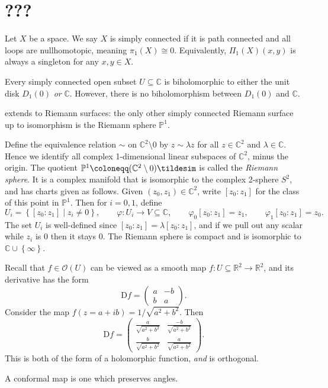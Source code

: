 \chapter{???}



\begin{definition}\label{3.1.1}
	Let $X$ be a space. We say $X$ is simply connected if it is path connected and all loops are nullhomotopic, meaning $\pi _1(X)\cong 0$. Equivalently, $\Pi _1(X)(x,y)$ is always a singleton for any $x,y\in X$.
\end{definition}

\begin{theorem}\label{3.1.2}
	Every simply connected open subset $U\subseteq \mathbb{C} $ is biholomorphic to either the unit disk $D_1(0)$ \emph{or} $\mathbb{C} $. However, there is no biholomorphism between $D_1(0)$ and $\mathbb{C} $.
\end{theorem}

\begin{remark}
	 extends to Riemann surfaces: the only other simply connected Riemann surface up to isomorphism is the Riemann sphere $\mathbb{P} ^1$.
\end{remark}

\begin{construction}
	Define the equivalence relation $\sim $ on $\mathbb{C} ^2\setminus 0$ by $z\sim \lambda z$ for all $z\in\mathbb{C} ^2$ and $\lambda \in\mathbb{C} $. Hence we identify all complex 1-dimensional linear subspaces of $\mathbb{C} ^2$, minus the origin. The quotient $\mathbb{P} ^1 \coloneqq (\mathbb{C} ^2\setminus 0)\tildesim $ is called the \emph{Riemann sphere}. It is a complex manifold that is isomorphic to the complex 2-sphere $S^2$, and has charts given as follows. Given $(z_0,z_1)\in\mathbb{C} ^2$, write $[z_0 : z_1]$ for the class of this point in $\mathbb{P} ^1$. Then for $i=0,1$, define
	\[
		U_i=\left\{ [z_0 : z_1] \mid z_i \neq 0 \right\} ,\qquad \varphi : U_i \to V\subseteq \mathbb{C},\qquad \varphi_0 [z_0 : z_1] = z_1,\qquad \varphi _1[z_0 : z_1]=z_0
	.\]
	The set $U_i$ is well-defined since $[z_0 : z_1] = \lambda [z_0 : z_1]$, and if we pull out any scalar while $z_i$ is 0 then it stays 0. The Riemann sphere is compact and is isomorphic to $\mathbb{C} \cup \left\{ \infty  \right\} $.
\end{construction}

	Recall that $f\in \mathcal{O} (U)$ can be viewed as a smooth map $f : U\subseteq \mathbb{R} ^2 \to \mathbb{R} ^2$, and its derivative has the form
	\[
		\mathrm{D} f=\begin{pmatrix}
		a & -b \\
		b & a
		\end{pmatrix}
	.\]
	Consider the map $f(z=a+ib)=1 / \sqrt{a^2+b^2} $. Then
	\[
		\mathrm{D} f = \begin{pmatrix}
		\frac{a}{\sqrt{a^2+b^2} }  & \frac{-b}{\sqrt{a^2+b^2} }  \\
		\frac{b}{\sqrt{a^2+b^2} }  & \frac{a}{\sqrt{a^2+b^2} } 
		\end{pmatrix}
	.\]
This is both of the form of a holomorphic function, \emph{and} is orthogonal.

A conformal map is one which preserves angles.
